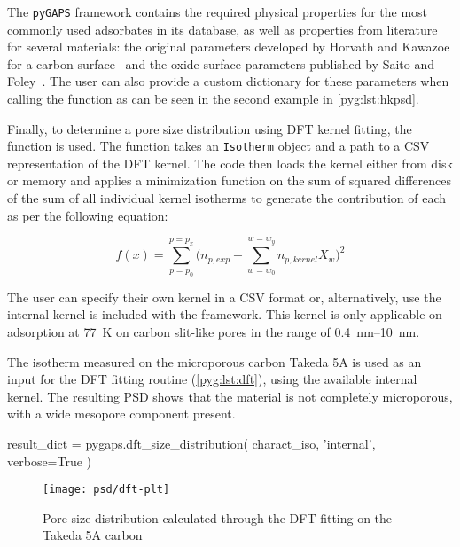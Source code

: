 The \texttt{pyGAPS} framework contains the required physical properties
for the most commonly used adsorbates in its database, as well as
properties from literature for several materials:
the original parameters developed by Horvath and Kawazoe for a 
carbon surface~\cite{horvathMethodCalculationEffective1983} and the
oxide surface parameters published by Saito and
Foley~\cite{saitoCurvatureParametricSensitivity1991}.
The user can also provide a custom dictionary for these parameters
when calling the function as can be seen in the second example
in \autoref{pyg:lst:hkpsd}.

Finally, to determine a pore size distribution using \gls{DFT} kernel fitting,
the  function is used. 
The function takes an \texttt{Isotherm} object and a path
to a CSV representation of the \gls{DFT} kernel. The code then
loads the kernel either from disk or memory and 
applies a minimization function on the sum of squared differences
of the sum of all individual kernel isotherms to generate 
the contribution of each as per the following equation:

\begin{equation}
	f(x) = \sum_{p=p_0}^{p=p_x} \Big(n_{p,exp} - \sum_{w=w_0}^{w=w_y} n_{p, kernel} X_w \Big)^2
\end{equation}

The user can specify their own kernel in a CSV format or, alternatively,
use the internal kernel is included with the framework. This kernel
is only applicable on  adsorption at \SI{77}{\kelvin} on 
carbon slit-like pores in the range of \SIrange{0.4}{10}{\nano\meter}.

The isotherm measured on the microporous carbon Takeda 5A is used as 
an input for the \gls{DFT} fitting routine (\autoref{pyg:lst:dft}), using the
available internal kernel. The resulting PSD shows that the material
is not completely microporous, with a wide mesopore component
present.

\begin{python}[caption={DFT size distribution in pyGAPS},%
    label={pyg:lst:dft}]
result_dict = pygaps.dft_size_distribution(
    charact_iso,
    'internal',
    verbose=True
)
\end{python}
\begin{figure}[!htb]
	\texttt{[image: psd/dft-plt]}
	\caption{Pore size distribution calculated through the \gls{DFT} fitting on the Takeda 5A carbon}%
	\label{fig:pyg:fig:dft}
\end{figure}

